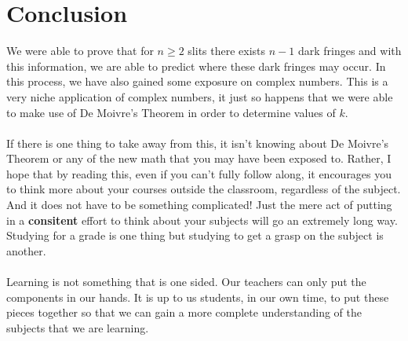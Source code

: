 \documentclass[12pt]{article}
\begin{document}
\section{Conclusion}
We were able to prove that for $n \geq 2$ slits there exists $n-1$ dark fringes and with this information,
we are able to predict where these dark fringes may occur. In this process, we have also gained some exposure on complex numbers.
This is a very niche application of complex numbers, it just so happens that we were able
to make use of De Moivre's Theorem in order to determine values of $k$. 
\\
\\
If there is one thing to take away from this, it isn't knowing about De Moivre's Theorem or 
any of the new math that you may have been exposed to. Rather, I hope that by reading this, even if you can't fully follow along, it encourages you to think more about your courses 
outside the classroom, regardless of the subject. And it does not have to be something complicated! Just the mere act of putting in a \textbf{consitent} effort to think
about your subjects will go an extremely long way. Studying for a grade is one thing but studying to get a grasp on the subject is another.
\\
\\
Learning is not something that is one sided. Our teachers can only put the components in our hands. It is up to us students,
in our own time, to put these pieces together so that we can gain a more complete understanding of the subjects that we are learning. 
\end{document}

